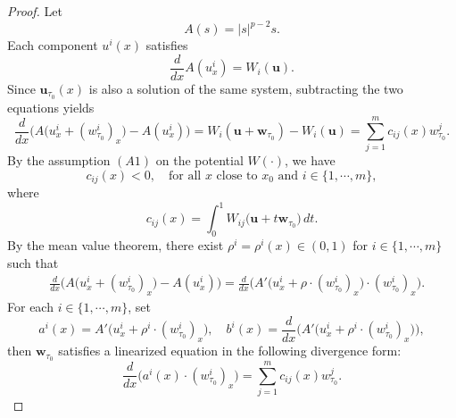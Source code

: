 \documentclass[11pt,twoside,reqno]{amsart}
\newcounter{assu}
\numberwithin{equation}{section}
\begin{document}
\begin{proof}
Let $$A(s)=|s|^{p-2}s.$$ Each component $u^i(x)$ satisfies $$\displaystyle\frac{d}{dx}A(u^{i}_{x})=W_{i}(\mathbf{u}).$$ Since $\mathbf{u}_{\tau_0}(x)$ is also a solution of  the same system, subtracting the two equations yields
\begin{equation*}
    \frac{d}{dx}\Big(A\big(u^{i}_{x}+(w_{\tau_0}^{i})_{x}\big)-A(u^{i}_{x})\Big)=W_{i}(\mathbf{u}+\mathbf{w}_{\tau_0})-W_{i}(\mathbf{u})=\sum_{j=1}^{m}c_{ij}(x)w_{\tau_0}^{j}.
\end{equation*}
By the assumption $(A1)$ on the potential $W(\cdot)$, we have 
\begin{equation}\label{eq. c_ij for w_tau is cooperative}
    c_{ij}(x)<0,\quad\mbox{for all }x\mbox{ close to }x_{0}\mbox{ and }i\in\{1,\cdots,m\},
\end{equation}
where
\[
c_{ij}(x)
=
\int_0^1
W_{ij}\big(\mathbf u+t\mathbf w_{\tau_0}\big)\,dt .
\]
By the mean value theorem, there exist $\rho^{i}=\rho^{i}(x)\in(0,1)$ for $i\in\{1,\cdots,m\}$ such that
\begin{align*}
    &\frac{d}{dx}\Big(A\big(u^{i}_{x}+(w_{\tau_0}^{i})_{x}\big)-A(u^{i}_{x})\Big)=\frac{d}{dx}\Big(A'\big(u^{i}_{x}+\rho\cdot(w_{\tau_0}^{i})_{x}\big)\cdot(w_{\tau_0}^{i})_{x}\Big).
\end{align*}
For each $i\in\{1,\cdots,m\}$, set
\begin{equation*}
    a^{i}(x)=A'\big(u^{i}_{x}+\rho^{i}\cdot(w_{\tau_0}^{i})_{x}\big),\quad b^{i}(x)=\frac{d}{dx}\Big(A'\big(u^{i}_{x}+\rho^{i}\cdot(w_{\tau_0}^{i})_{x}\big)\Big),
\end{equation*}
then $\mathbf{w}_{\tau_0}$ satisfies a linearized equation in the following divergence form:
\begin{equation}\label{uniformeq}
    \frac{d}{dx}\Big(a^{i}(x)\cdot(w^{i}_{\tau_0})_{x}\Big)=\sum_{j=1}^{m}c_{ij}(x)w^{j}_{\tau_0}.
\end{equation}


\end{proof}
\end{document}

